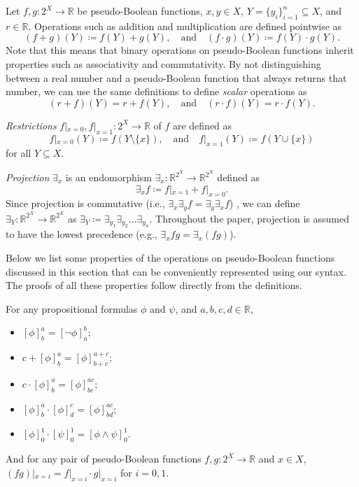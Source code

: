 \documentclass[runningheads]{llncs}
\begin{document}
\begin{definition}[Operations] \label{def:operations}
  Let $f, g\colon 2^X \to \mathbb{R}$ be pseudo-Boolean functions, $x, y \in X$,
  $Y = \{y_i\}_{i=1}^n \subseteq X$, and $r \in \mathbb{R}$. Operations such as
  addition and multiplication are defined pointwise as
  \[
    (f+g)(Y) \coloneqq f(Y)+g(Y), \quad \text{and} \quad (f \cdot g)(Y)
    \coloneqq f(Y) \cdot g(Y).
  \]
  Note that this means that binary operations on pseudo-Boolean functions
  inherit properties such as associativity and commutativity. By not
  distinguishing between a real number and a pseudo-Boolean function that always
  returns that number, we can use the same definitions to define \emph{scalar}
  operations as
  \[
    (r+f)(Y) = r+f(Y), \quad \text{and} \quad (r \cdot f)(Y) = r \cdot f(Y).
  \]

  \emph{Restrictions} $f|_{x=0}, f|_{x=1}\colon 2^X \to \mathbb{R}$ of $f$ are
  defined as
  \[
    f|_{x=0}(Y) \coloneqq f(Y \setminus \{x\}), \quad \text{and} \quad
    f|_{x=1}(Y) \coloneqq f(Y \cup \{x\})
  \]
  for all $Y \subseteq X$.

  \emph{Projection} $\exists_x$ is an endomorphism $\exists_x\colon
  \mathbb{R}^{2^X} \to \mathbb{R}^{2^X}$ defined as
  \[
    \exists_xf \coloneqq f|_{x=1} + f|_{x=0}.
  \]
  Since projection is commutative (i.e., $\exists_x\exists_yf =
  \exists_y\exists_xf$) \cite{DBLP:conf/aaai/DudekPV20,DBLP:conf/cp/DudekPV20},
  we can define $\exists_Y\colon \mathbb{R}^{2^X} \to \mathbb{R}^{2^X}$ as
  $\exists_Y \coloneqq \exists_{y_1}\exists_{y_2}\dots\exists_{y_n}$. Throughout
  the paper, projection is assumed to have the lowest precedence (e.g.,
  $\exists_x fg = \exists_x (fg)$).
\end{definition}

Below we list some properties of the operations on pseudo-Boolean functions
discussed in this section that can be conveniently represented using our syntax.
The proofs of all these properties follow directly from the definitions.

\begin{proposition} \label{prop:basic}
  For any propositional formulas $\phi$ and $\psi$, and $a, b, c, d \in
  \mathbb{R}$,
  \begin{itemize}
  \item $[\phi]^a_b = [\neg \phi]^b_a$;
  \item $c + [\phi]^a_b = [\phi]^{a+c}_{b+c}$;
  \item $c \cdot [\phi]^a_b = [\phi]^{ac}_{bc}$;
  \item $[\phi]^a_b \cdot [\phi]^c_d = [\phi]^{ac}_{bd}$;
  \item $[\phi]^1_0 \cdot [\psi]_0^1 = [\phi \land \psi]_0^1$.
  \end{itemize}
  And for any pair of pseudo-Boolean functions $f, g \colon 2^X \to \mathbb{R}$
  and $x \in  X$, $(fg)|_{x=i} = f|_{x=i} \cdot g|_{x=i}$ for $i = 0, 1$.
\end{proposition}
\end{document}
